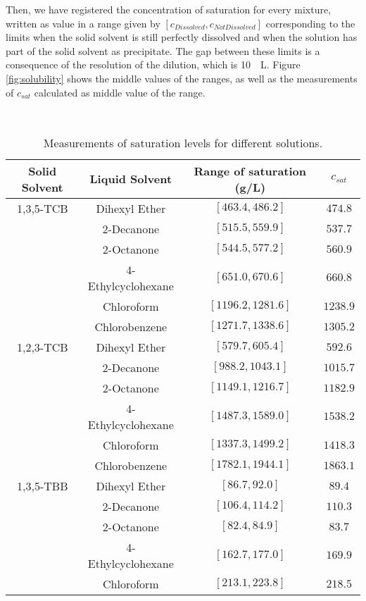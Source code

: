 \documentclass  [
  paper    = a4,
  BCOR     = 10mm,
  twoside,
  fontsize = 12pt,
  fleqn,
  toc      = bibnumbered,
  toc      = listofnumbered,
  numbers  = noendperiod,
  headings = normal,
  listof   = leveldown,
  version  = 3.03
]                                       {scrreprt}
\begin{document}
Then, we have registered the concentration of saturation for every mixture, written as value in a range given by $[c_{Dissolved}, c_{Not Dissolved}]$ corresponding to the limits when the solid solvent is still perfectly dissolved and when the solution has part of the solid solvent as precipitate. The gap between these limits is a consequence of the resolution of the dilution, which is \SI{10}{\mu L}. Figure \ref{fig:solubility} shows the middle values of the ranges, as well as the measurements of $c_{sat}$ calculated as middle value of the range.\\

\newpage
\begin{table*}[!h]\scriptsize
	\caption{\small Measurements of saturation levels for different solutions.}
	\label{tab:solids}
	~\\
	\centering
	\begin{tabular}{cccc}
		\textbf{Solid Solvent} & \textbf{Liquid Solvent} & \textbf{Range of saturation (g/L)} & $c_{sat}$\\
		\hline
		1,3,5-TCB & Dihexyl Ether & $[463.4, 486.2]$ & $474.8$\\
				& 2-Decanone & $[515.5, 559.9]$ & $537.7$\\
				& 2-Octanone & $[544.5, 577.2]$ & $560.9$\\
				& 4-Ethylcyclohexane & $[651.0, 670.6]$ & $660.8$\\
				& Chloroform & $[1196.2, 1281.6]$ & $1238.9$\\
				& Chlorobenzene & $[1271.7, 1338.6]$ & $1305.2$\\
		\midrule
		1,2,3-TCB &  Dihexyl Ether & $[579.7, 605.4]$ & $592.6$\\
				& 2-Decanone & $[988.2, 1043.1]$ & $1015.7$\\
				& 2-Octanone & $[1149.1, 1216.7]$ & $1182.9$\\
				& 4-Ethylcyclohexane & $[1487.3, 1589.0]$ & $1538.2$\\
				& Chloroform & $[1337.3, 1499.2]$ & $1418.3$\\
				& Chlorobenzene & $[1782.1, 1944.1]$ & $1863.1$\\
		\midrule
		1,3,5-TBB & Dihexyl Ether & $[86.7, 92.0]$ & $89.4$\\
				& 2-Decanone & $[106.4, 114.2]$ & $110.3$\\
				& 2-Octanone & $[82.4, 84.9]$ & $83.7$\\
				& 4-Ethylcyclohexane & $[162.7, 177.0]$ & $169.9$\\
				& Chloroform & $[213.1, 223.8]$ & $218.5$\\

\end{tabular}
\end{table*}
\end{document}
